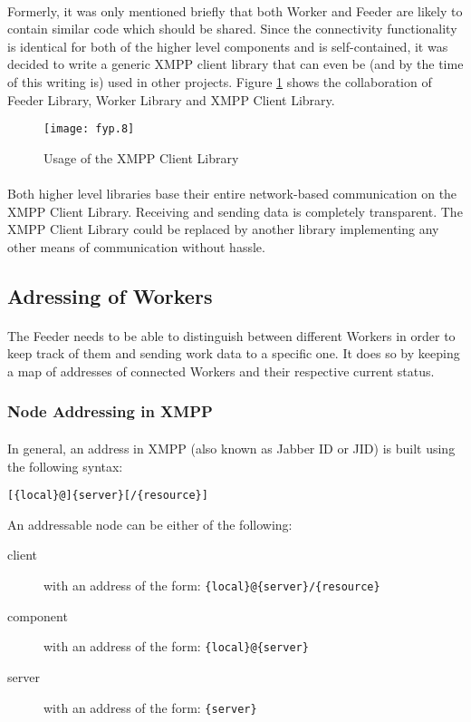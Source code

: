 \paragraph{}
Formerly, it was only mentioned briefly that both Worker and Feeder are likely to contain similar code which should be shared. Since the connectivity functionality is identical for both of the higher level components and is self-contained, it was decided to write a generic XMPP client library that can even be (and by the time of this writing is) used in other projects. Figure \ref{fig:justification} shows the collaboration of Feeder Library, Worker Library and XMPP Client Library.

\begin{figure}[H]
\begin{center}
\texttt{[image: fyp.8]}
\end{center}
\caption{Usage of the XMPP Client Library}
\label{fig:justification}
\end{figure}

\paragraph{}
Both higher level libraries base their entire network-based communication on the XMPP Client Library. Receiving and sending data is completely transparent. The XMPP Client Library could be replaced by another library implementing any other means of communication without hassle.

\subsection{Adressing of Workers}
\paragraph{}
The Feeder needs to be able to distinguish between different Workers in order to keep track of them and sending work data to a specific one. It does so by keeping a map of addresses of connected Workers and their respective current status.

\subsubsection{Node Addressing in XMPP}
\paragraph{}
In general, an address in XMPP (also known as Jabber ID or JID) is built using the following syntax:
\begin{center}
\texttt{[\{local\}@]\{server\}[/\{resource\}]}
\end{center}
An addressable node can be either of the following:
\begin{description}
\item[client] with an address of the form: \texttt{\{local\}@\{server\}/\{resource\}}
\item[component] with an address of the form: \texttt{\{local\}@\{server\}} 
\item[server] with  an address of the form: \texttt{\{server\}}
\end{description}
